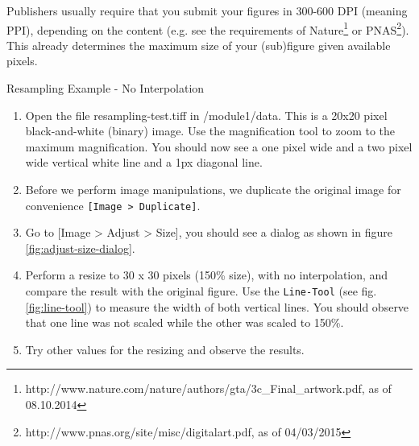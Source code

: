 Publishers usually require that you submit your figures in 300-600 DPI (meaning PPI), depending on the content (e.g. see the requirements of Nature\footnote{http://www.nature.com/nature/authors/gta/3c\_Final\_artwork.pdf, as of 08.10.2014} or PNAS\footnote{http://www.pnas.org/site/misc/digitalart.pdf, as of 04/03/2015}). This already determines the maximum size of your (sub)figure given available pixels. 

\begin{taskbox}{Resampling Example - No Interpolation}

\begin{enumerate}
	\item Open the file resampling-test.tiff in /module1/data. This is a 20x20 pixel black-and-white (binary) image. Use the magnification tool to zoom to the maximum magnification. You should now see a one pixel wide and a two pixel wide vertical white line and a 1px diagonal line. 
	\item Before we perform image manipulations, we duplicate the original image for convenience \texttt{[Image > Duplicate]}.
	\item Go to [Image > Adjust > Size], you should see a dialog as shown in figure \ref{fig:adjust-size-dialog}.
	
	\begin{minipage}[t]{\linewidth}
		\begin{center}
		\medskip
		\label{fig:adjust-size-dialog}
		\end{center}
	\end{minipage}
	
	\item Perform a resize to 30 x 30 pixels (150\% size), with no interpolation, and compare the result with the original figure. Use the \texttt{Line-Tool} (see fig. \ref{fig:line-tool}) to measure the width of both vertical lines. You should observe that one line was not scaled while the other was scaled to 150\%.
	
	\begin{minipage}[t]{\linewidth}
		\begin{center}
		\medskip
		\label{fig:line-tool}
		\end{center}
	\end{minipage}
	
	\item Try other values for the resizing and observe the results.
\end{enumerate}

\end{taskbox}

